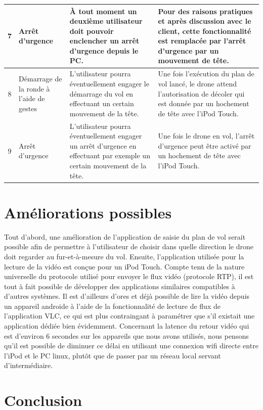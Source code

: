 \documentclass{article}
\begin{document}
\begin{center}
\begin{tabularx}{15cm}{|c|p{3cm}|p{5cm}||X|}
            \hline
            7 & Arrêt d'urgence  & À tout moment un deuxième utilisateur doit pouvoir enclencher un arrêt d'urgence depuis le PC. & Pour des raisons pratiques et après discussion avec le client, cette fonctionnalité est remplacée par l'arrêt d'urgence par un mouvement de tête.\\
            \hline
            8 & Démarrage de la ronde à l'aide de gestes & L'utilisateur pourra éventuellement engager le démarrage du vol en effectuant un certain mouvement de la tête. & Une fois l'exécution du plan de vol lancé, le drone attend l'autorisation de décoler qui est donnée par un hochement de tête avec l'iPod Touch.	\\
			\hline
			9 & Arrêt d'urgence & L'utilisateur pourra éventuellement engager un arrêt d'urgence en effectuant par exemple un certain mouvement de la tête. & Une fois le drone en vol, l'arrêt d'urgence peut être activé par un hochement de tête avec l'iPod Touch.	\\
			\hline
        \end{tabularx}
        \end{center}
	
\newpage
\section{Améliorations possibles}
Tout d'abord, une amélioration de l'application de saisie du plan de vol serait possible afin de permettre à l'utilisateur de choisir dans quelle direction le drone doit regarder au fur-et-à-mesure du vol.
\medbreak
Ensuite, l'application utilisée pour la lecture de la vidéo est conçue pour un iPod Touch. Compte tenu de la nature universelle du protocole utilisé pour envoyer le flux vidéo (protocole RTP), il est tout à fait possible de développer des applications similaires compatibles à d'autres systèmes. Il est d'ailleurs d'ores et déjà possible de lire la vidéo depuis un appareil androide à l'aide de la fonctionnalité de lecture de flux de l'application VLC, ce qui est plus contraingant à paramétrer que s'il existait une application dédiée bien évidemment.
\medbreak
Concernant la latence du retour vidéo qui est d'environ 6 secondes sur les appareils que nous avons utilisés, nous pensons qu'il est possible de diminuer ce délai en utilisant une connexion wifi directe entre l'iPod et le PC linux, plutôt que de passer par un réseau local servant d'intermédiaire.

\newpage
\section{Conclusion}
	
 
\end{document}
